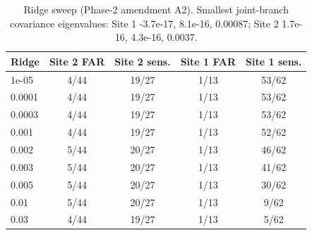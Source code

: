 \begin{table}[h!]\centering\footnotesize\caption{Ridge sweep (Phase-2 amendment A2). Smallest joint-branch covariance eigenvalues: Site 1 -3.7e-17, 8.1e-16, 0.00087; Site 2 1.7e-16, 4.3e-16, 0.0037.}\label{tab:S5b}
\begin{tabular}{lcccc}\toprule
Ridge & Site 2 FAR & Site 2 sens. & Site 1 FAR & Site 1 sens.\\\midrule
1e-05 & 4/44 & 19/27 & 1/13 & 53/62\\
0.0001 & 4/44 & 19/27 & 1/13 & 53/62\\
0.0003 & 4/44 & 19/27 & 1/13 & 53/62\\
0.001 & 4/44 & 19/27 & 1/13 & 52/62\\
0.002 & 5/44 & 20/27 & 1/13 & 46/62\\
0.003 & 5/44 & 20/27 & 1/13 & 41/62\\
0.005 & 5/44 & 20/27 & 1/13 & 30/62\\
0.01 & 5/44 & 20/27 & 1/13 & 9/62\\
0.03 & 4/44 & 19/27 & 1/13 & 5/62\\
\bottomrule\end{tabular}\end{table}

